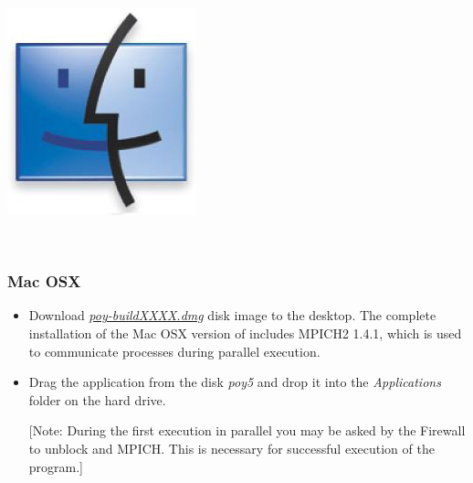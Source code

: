 \begin{flushleft}
\begin{itemize}
\end{itemize}

\begin{minipage}[c]{0.074\textwidth}
\includegraphics[width=\textwidth]{doc/figures/figlogomac.jpg}
\end{minipage}
\,
\begin{minipage}[t]{0.88\textwidth}
\subsubsection*{Mac OSX}
\end{minipage}
\begin{itemize}
\item Download
\href{http://research.amnh.org/scicomp/projects/poy.php}{\emph{poy-buildXXXX.dmg}} disk image 
to the desktop. The complete installation of the Mac OSX version of \poy includes MPICH2 1.4.1, 
which is used to communicate processes during parallel execution.
\item Drag the \poy application from the disk \emph{poy5} and drop it into the \emph{Applications}
folder on the hard drive.  

[Note: During the first execution in parallel you may be asked by the Firewall to 
unblock \poy and MPICH.  This is necessary for successful execution of the program.]
\end{itemize}


\end{flushleft}
